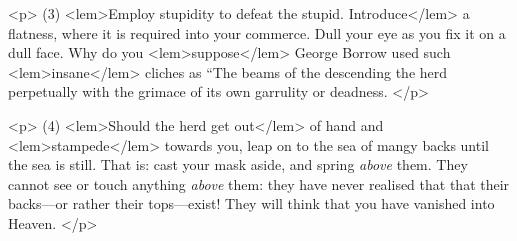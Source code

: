 {{				<p>
				\vspace{10pt}
				\noindent(3)\hspace{20pt} 
<lem>Employ stupidity to defeat the stupid. Introduce</lem> 
					{}
				 a flatness, where it is required 
				into your commerce. Dull your eye as you fix it on a dull face. Why do you 
<lem>suppose</lem> 
					{}
				George Borrow used such 
<lem>insane</lem> 
					{}
				cliches as “The beams of the descending  
					{}
				the herd perpetually with the grimace of its own garrulity or 
				deadness. 
 				</p> 

				<p>
				\vspace{10pt}
				\noindent(4)\hspace{20pt} 
<lem>Should the herd get out</lem> 
					{}
				of hand and 
<lem>stampede</lem>
					{} 
				towards you, leap on to the sea 
				of mangy backs until the sea is still. That is: cast your mask aside, and spring 
				\emph{above} them. They cannot see or touch anything \emph{above} them: 
				they have never realised that 
				that their backs---or rather their tops---exist! They will think that you have 
				vanished into Heaven. 
 				</p> 

}}
